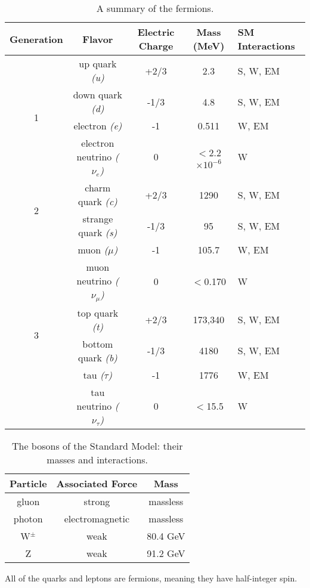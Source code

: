 \begin{table}
	\caption{A summary of the fermions. 	\label{tab:QLTable}}
	\begin{tabular}{| c || c | c | c | p{2cm} |}
		\hline
		Generation &  Flavor & Electric Charge & Mass (MeV) & SM Interactions\\
		\hline
		\multirow{4}{*}{1} & up quark \it{(u)} & +2/3 & 2.3 & S, W, EM\\
		    & down quark \it{(d)} & -1/3 & 4.8 & S, W, EM\\
		    & electron \it{(e)}& -1 & 0.511 & W, EM \\
		    & electron neutrino \it{($\nu_{e}$)} & 0 & $<$2.2$\times 10^{-6}$ & W\\
		\hline
		\multirow{2}{*}{2} & charm quark \it{(c)} & +2/3 & 1290 &  S, W, EM \\
		    & strange quark \it{(s)} & -1/3 & 95 & S, W, EM \\
		    & muon \it{($\mu$)} & -1& 105.7 & W, EM \\
		    & muon neutrino \it{($\nu_{\mu}$)} & 0 & $<$0.170 & W \\
		\hline 
		\multirow{2}{*}{3} & top quark \it{(t)} & +2/3 & 173,340 & S, W, EM \\
		    & bottom quark \it{(b)} & -1/3  & 4180 & S, W, EM \\ 
		    & tau \it{($\tau$)} & -1 & 1776 & W, EM\\
		    & tau neutrino \it{($\nu_{\tau}$)} & 0 & $<$15.5 & W\\		    
		\hline
	\end{tabular}
\end{table}


\begin{table}
	\caption{The bosons of the Standard Model: their masses and interactions.  \label{tab:boson_table}}
    \center
	\begin{tabular}{| c || c | c |}
	\hline
	Particle & Associated Force & Mass \\
	\hline
	gluon & strong & massless \\
	photon & electromagnetic & massless \\
	W$^\pm$ & weak & 80.4 GeV \\
	Z & weak & 91.2 GeV \\ 
	\hline
	\end{tabular}
\end{table}


All of the quarks and leptons are fermions, meaning they have half-integer spin.

